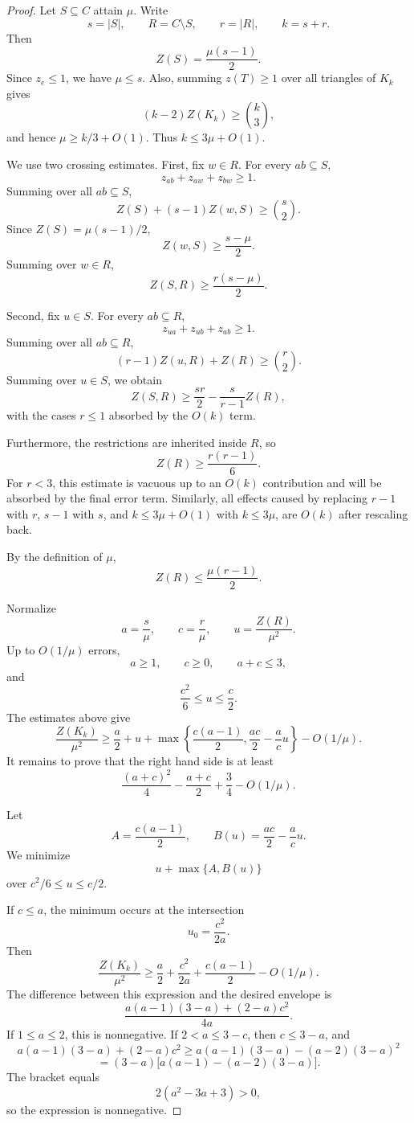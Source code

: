 \documentclass[11pt]{article}
\begin{document}
\begin{proof}
Let \(S\subseteq C\) attain \(\mu\). Write
\[
    s=|S|,
    \qquad
    R=C\setminus S,
    \qquad
    r=|R|,
    \qquad
    k=s+r.
\]
Then
\[
    Z(S)=\frac{\mu(s-1)}2.
\]
Since \(z_e\le1\), we have \(\mu\le s\). Also, summing \(z(T)\ge1\) over all triangles of \(K_k\) gives
\[
    (k-2)Z(K_k)\ge\binom{k}{3},
\]
and hence \(\mu\ge k/3+O(1)\). Thus \(k\le3\mu+O(1)\).

We use two crossing estimates. First, fix \(w\in R\). For every \(ab\subseteq S\),
\[
    z_{ab}+z_{aw}+z_{bw}\ge1.
\]
Summing over all \(ab\subseteq S\),
\[
    Z(S)+(s-1)Z(w,S)\ge\binom{s}{2}.
\]
Since \(Z(S)=\mu(s-1)/2\),
\[
    Z(w,S)\ge\frac{s-\mu}{2}.
\]
Summing over \(w\in R\),
\[
    Z(S,R)\ge\frac{r(s-\mu)}2.
\]

Second, fix \(u\in S\). For every \(ab\subseteq R\),
\[
    z_{ua}+z_{ub}+z_{ab}\ge1.
\]
Summing over all \(ab\subseteq R\),
\[
    (r-1)Z(u,R)+Z(R)\ge\binom r2.
\]
Summing over \(u\in S\), we obtain
\[
    Z(S,R)\ge
    \frac{sr}{2}
    -
    \frac{s}{r-1}Z(R),
\]
with the cases \(r\le1\) absorbed by the \(O(k)\) term.

Furthermore, the restrictions are inherited inside \(R\), so
\[
    Z(R)\ge\frac{r(r-1)}6.
\]
For \(r<3\), this estimate is vacuous up to an \(O(k)\) contribution and will be absorbed by the final error term. Similarly, all effects caused by replacing \(r-1\) with \(r\), \(s-1\) with \(s\), and \(k\le3\mu+O(1)\) with \(k\le3\mu\), are \(O(k)\) after rescaling back.

By the definition of \(\mu\),
\[
    Z(R)\le\frac{\mu(r-1)}2.
\]

Normalize
\[
    a=\frac{s}{\mu},
    \qquad
    c=\frac{r}{\mu},
    \qquad
    u=\frac{Z(R)}{\mu^2}.
\]
Up to \(O(1/\mu)\) errors,
\[
    a\ge1,\qquad c\ge0,\qquad a+c\le3,
\]
and
\[
    \frac{c^2}{6}\le u\le\frac c2.
\]
The estimates above give
\[
    \frac{Z(K_k)}{\mu^2}
    \ge
    \frac a2
    +
    u
    +
    \max\left\{
        \frac{c(a-1)}2,
        \frac{ac}{2}-\frac{a}{c}u
    \right\}
    -
    O(1/\mu).
\]
It remains to prove that the right hand side is at least
\[
    \frac{(a+c)^2}{4}-\frac{a+c}{2}+\frac34-O(1/\mu).
\]

Let
\[
    A=\frac{c(a-1)}2,
    \qquad
    B(u)=\frac{ac}{2}-\frac{a}{c}u.
\]
We minimize
\[
    u+\max\{A,B(u)\}
\]
over \(c^2/6\le u\le c/2\).

If \(c\le a\), the minimum occurs at the intersection
\[
    u_0=\frac{c^2}{2a}.
\]
Then
\[
    \frac{Z(K_k)}{\mu^2}
    \ge
    \frac a2+\frac{c^2}{2a}+\frac{c(a-1)}2-O(1/\mu).
\]
The difference between this expression and the desired envelope is
\[
    \frac{a(a-1)(3-a)+(2-a)c^2}{4a}.
\]
If \(1\le a\le2\), this is nonnegative. If \(2<a\le3-c\), then \(c\le3-a\), and
\[
    a(a-1)(3-a)+(2-a)c^2
    \ge
    a(a-1)(3-a)-(a-2)(3-a)^2
\]
\[
    =
    (3-a)\bigl[a(a-1)-(a-2)(3-a)\bigr].
\]
The bracket equals
\[
    2(a^2-3a+3)>0,
\]
so the expression is nonnegative.


\end{proof}
\end{document}
